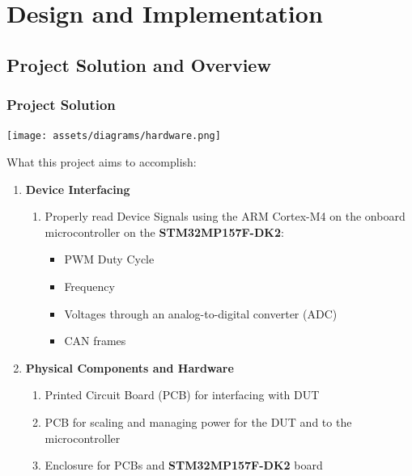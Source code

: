 \documentclass[8pt,compress,aspectratio=169]{beamer}
\newcommand\LightBold[1]{\textcolor{VSBlueLight}{\textbf{#1}}}
\newcommand\DarkBold[1]{\textcolor{VSBlueDark}{\textbf{#1}}}
\begin{document}
\section{Design and Implementation}
\subsection{Project Solution and Overview}

\begin{frame}
  \frametitle{Project Solution}
  \centering
  \texttt{[image: assets/diagrams/hardware.png]}
  \begin{block}{What this project aims to accomplish:}
    \begin{enumerate}
      \item {\DarkBold{Device Interfacing}}
        \begin{enumerate}
          \item Properly read Device Signals using the ARM Cortex-M4 on the onboard microcontroller on the 
            \LightBold{STM32MP157F-DK2}:
            \begin{itemize}
              \item PWM Duty Cycle
              \item Frequency
              \item Voltages through an analog-to-digital converter (ADC)
              \item CAN frames
            \end{itemize}
        \end{enumerate}
      \item \DarkBold{Physical Components and Hardware}
        \begin{enumerate}
          \item Printed Circuit Board (PCB) for interfacing with DUT
          \item PCB for scaling and managing power for the DUT and to the microcontroller
          \item Enclosure for PCBs and \LightBold{STM32MP157F-DK2} board
        \end{enumerate}
    \end{enumerate}
  \end{block}
\end{frame}
\end{document}
